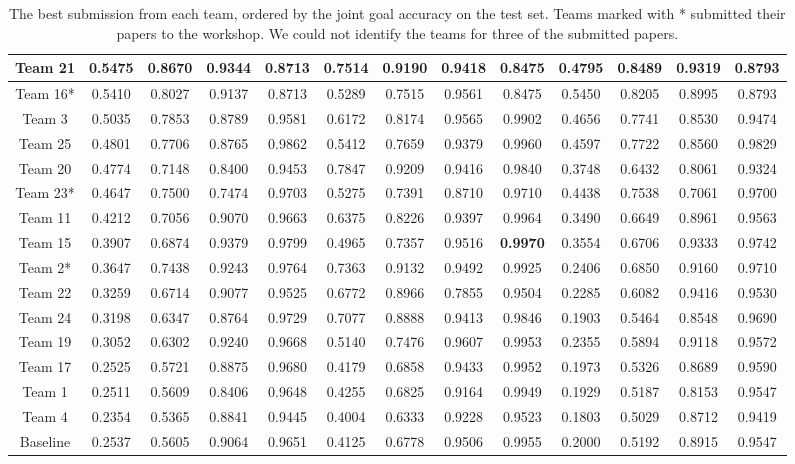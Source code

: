\begin{table*}[ht]
{\begin{tabular}{c!{\vrule width 2pt}c|c|c|c!{\vrule width 2pt}c|c|c|c!{\vrule width 2pt}c|c|c|c}
Team 21 & 0.5475 & 0.8670 & 0.9344 & 0.8713 & 0.7514 & 0.9190 & 0.9418 & 0.8475 & 0.4795 & 0.8489 & 0.9319 & 0.8793 \\\hline
Team 16* & 0.5410 & 0.8027 & 0.9137 & 0.8713 & 0.5289 & 0.7515 & 0.9561 & 0.8475 & 0.5450 & 0.8205 & 0.8995 & 0.8793 \\\hline
Team 3 & 0.5035 & 0.7853 & 0.8789 & 0.9581 & 0.6172 & 0.8174 & 0.9565 & 0.9902 & 0.4656 & 0.7741 & 0.8530 & 0.9474 \\\hline
Team 25 & 0.4801 & 0.7706 & 0.8765 & 0.9862 & 0.5412 & 0.7659 & 0.9379 & 0.9960 & 0.4597 & 0.7722 & 0.8560 & 0.9829 \\\hline
Team 20 & 0.4774 & 0.7148 & 0.8400 & 0.9453 & 0.7847 & 0.9209 & 0.9416 & 0.9840 & 0.3748 & 0.6432 & 0.8061 & 0.9324 \\\hline
Team 23* & 0.4647 & 0.7500 & 0.7474 & 0.9703 & 0.5275 & 0.7391 & 0.8710 & 0.9710 & 0.4438 & 0.7538 & 0.7061 & 0.9700 \\\hline
Team 11 & 0.4212 & 0.7056 & 0.9070 & 0.9663 & 0.6375 & 0.8226 & 0.9397 & 0.9964 & 0.3490 & 0.6649 & 0.8961 & 0.9563 \\\hline
Team 15 & 0.3907 & 0.6874 & 0.9379 & 0.9799 & 0.4965 & 0.7357 & 0.9516 & \textbf{0.9970} & 0.3554 & 0.6706 & 0.9333 & 0.9742 \\\hline
Team 2* & 0.3647 & 0.7438 & 0.9243 & 0.9764 & 0.7363 & 0.9132 & 0.9492 & 0.9925 & 0.2406 & 0.6850 & 0.9160 & 0.9710 \\\hline
Team 22 & 0.3259 & 0.6714 & 0.9077 & 0.9525 & 0.6772 & 0.8966 & 0.7855 & 0.9504 & 0.2285 & 0.6082 & 0.9416 & 0.9530 \\\hline
Team 24 & 0.3198 & 0.6347 & 0.8764 & 0.9729 & 0.7077 & 0.8888 & 0.9413 & 0.9846 & 0.1903 & 0.5464 & 0.8548 & 0.9690 \\\hline
Team 19 & 0.3052 & 0.6302 & 0.9240 & 0.9668 & 0.5140 & 0.7476 & 0.9607 & 0.9953 & 0.2355 & 0.5894 & 0.9118 & 0.9572 \\\hline
Team 17 & 0.2525 & 0.5721 & 0.8875 & 0.9680 & 0.4179 & 0.6858 & 0.9433 & 0.9952 & 0.1973 & 0.5326 & 0.8689 & 0.9590 \\\hline
Team 1 & 0.2511 & 0.5609 & 0.8406 & 0.9648 & 0.4255 & 0.6825 & 0.9164 & 0.9949 & 0.1929 & 0.5187 & 0.8153 & 0.9547 \\\hline
Team 4 & 0.2354 & 0.5365 & 0.8841 & 0.9445 & 0.4004 & 0.6333 & 0.9228 & 0.9523 & 0.1803 & 0.5029 & 0.8712 & 0.9419 \\\hline
Baseline & 0.2537 & 0.5605 & 0.9064 & 0.9651 & 0.4125 & 0.6778 & 0.9506 & 0.9955 & 0.2000 & 0.5192 & 0.8915 & 0.9547  \\ \hline
\toprule
\end{tabular}
}
\caption{The best submission from each team, ordered by the joint goal accuracy on the test set. Teams marked with * submitted their papers to the workshop. We could not identify the teams for three of the submitted papers.}
\label{table:metrics}
\end{table*}

